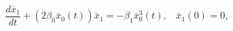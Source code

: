 \begin{equation}%
\frac{d\bar{x}_1}{dt} + \left( 2\beta_0 \bar{x}_0 (t) \right) \bar{x}_1
= - \beta_1 \bar{x}_0^3 (t), \; \; \; \bar{x}_1 (0) = 0,
\end{equation}

